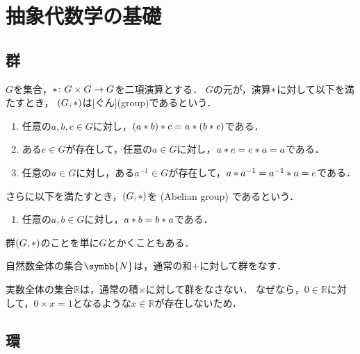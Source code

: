 \documentclass[../sotsu.tex]{subfiles}
\begin{document}
\section{抽象代数学の基礎}

\subsection{群}

\begin{definition}[群]
    \label{dfn:group}
    $G$を集合，$\mathbin{\ast} \colon G \times G \to G$を二項演算とする．
    $G$の元が，演算$\mathbin{\ast}$に対して以下を満たすとき，
    $(G, \mathbin{\ast})$は[ぐん](group)であるという．
    \begin{enumerate}
        \item 任意の$a, b, c \in G$に対し，$(a \mathbin{\ast} b) \mathbin{\ast} c = a \mathbin{\ast} (b \mathbin{\ast} c)$である．
        \item ある$e \in G$が存在して，任意の$a \in G$に対し，$a \mathbin{\ast} e = e \mathbin{\ast} a = a$である．
        \item 任意の$a \in G$に対し，ある$a^{-1} \in G$が存在して，$a \mathbin{\ast} a^{-1} = a^{-1} \mathbin{\ast} a = e$である．
    \end{enumerate}
    さらに以下を満たすとき，$(G, \mathbin{\ast})$を%
    (Abelian group)%
    であるという．
    \begin{enumerate}[resume]
        \item 任意の$a, b \in G$に対し，$a \mathbin{\ast} b = b \mathbin{\ast} a$である．
    \end{enumerate}
    群$(G, \mathbin{\ast})$のことを単に$G$とかくこともある．
\end{definition}


自然数全体の集合$\symbb{N}$は，通常の和$+$に対して群をなす．

実数全体の集合$ℝ$は，通常の積$\times$に対して群をなさない．
なぜなら，$0 \in ℝ$に対して，$0 \times x = 1$となるような$x \in ℝ$が存在しないため．


\subsection{環}
\end{document}
